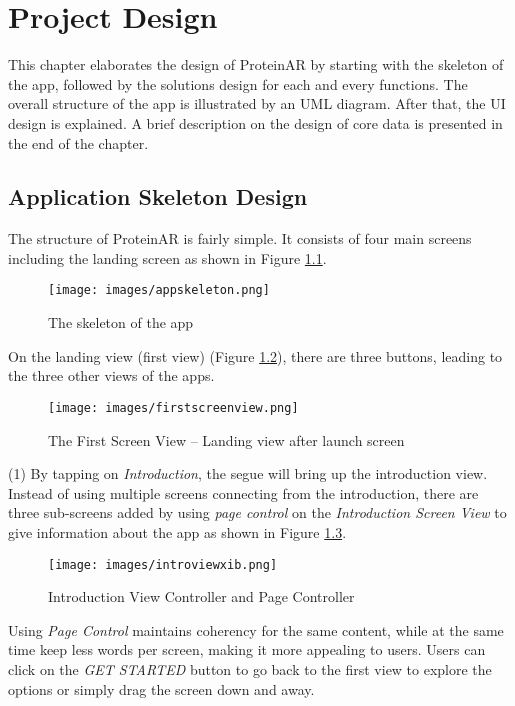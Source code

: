 \chapter{Project Design}
\label{ch:design}

This chapter elaborates the design of ProteinAR by starting with the skeleton of the app, followed by the solutions design for each and every functions. The overall structure of the app is illustrated by an UML diagram. After that, the UI design is explained. A brief description on the design of core data is presented in the end of the chapter.

\section{Application Skeleton Design}
The structure of ProteinAR is fairly simple. It consists of four main screens including the landing screen as shown in Figure \ref{fig:appskeleton}. 
\begin{figure}[!htp]
	\centering
	\texttt{[image: images/appskeleton.png]}
	\caption{The skeleton of the app}
	\label{fig:appskeleton}
\end{figure}

On the landing view (first view) (Figure \ref{fig:firstview}), there are three buttons, leading to the three other views of the apps. 
\begin{figure}[!htp]
	\centering
	\texttt{[image: images/firstscreenview.png]}
	\caption{The First Screen View – Landing view after launch screen}
	\label{fig:firstview}
\end{figure}

(1) By tapping on \emph{Introduction}, the segue will bring up the introduction view. Instead of using multiple screens connecting from the introduction, there are three sub-screens added by using \emph{page control} on the \emph{Introduction Screen View} to give information about the app as shown in Figure \ref{fig:introviewxib}.
\begin{figure}[!htp]
	\centering
	\texttt{[image: images/introviewxib.png]}
	\caption{Introduction View Controller and Page Controller}
	\label{fig:introviewxib}
\end{figure}
Using \emph{Page Control} maintains coherency for the same content, while at the same time keep less words per screen, making it more appealing to users. Users can click on the \emph{GET STARTED} button to go back to the first view to explore the options or simply drag the screen down and away.


